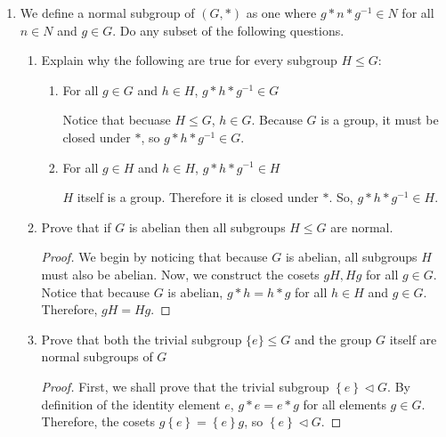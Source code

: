 \documentclass{article}
\newcommand{\set}[1]{\left\{#1\right\}}
\newcommand{\inv}{^{-1}}
\newcommand{\normsub}{\lhd}
\begin{document}
\begin{enumerate}
    \item [1.] {
        We define a normal subgroup of \((G,*)\) as one where \(g * n * g^{-1} \in N\) for all \(n \in N\) and \(g \in G\). Do any subset of the following questions.
  
        \begin{enumerate}
            \item {
                Explain why the following are true for every subgroup \(H \leq G\):
      
                \begin{enumerate}
                    \item {
                        For all \(g \in G\) and \(h \in H\), \(g * h * g^{-1} \in G\)

                        Notice that becuase \(H \le G\), \(h \in G\). Because 
                        \(G\) is a group, it must be closed under \(*\), so 
                        \(g * h * g\inv \in G\).
                    }
                    \item {
                        For all \(g \in H\) and \(h \in H\), \(g * h * g^{-1} \in H\)

                        \(H\) itself is a group. Therefore it is closed under \(*\).
                        So, \(g * h * g\inv \in H\).
                    }
                \end{enumerate}
            }

            \item {
                Prove that if \(G\) is abelian then all subgroups \(H \leq G\) are normal.
    
                \begin{proof}
                    We begin by noticing that because \(G\) is abelian, all subgroups 
                    \(H\) must also be abelian. Now, we construct the cosets 
                    \(gH, Hg\) for all \(g \in G\). Notice that because \(G\) is 
                    abelian, \(g * h = h * g\) for all \(h \in H\) and \(g \in G\).
                    Therefore, \(gH = Hg\).
                \end{proof}
            }

            \item {
                Prove that both the trivial subgroup \(\{e\} \leq G\) and the group \(G\) itself are normal subgroups of \(G\)

                \begin{proof}
                    First, we shall prove that the trivial subgroup \(\set{e} \normsub G\).
                    By definition of the identity element \(e\), \(g * e = e * g\) 
                    for all elements \(g \in G\). Therefore, the cosets \(g\set{e} = \set{e}g\),
                    so \(\set e \normsub G\).


\end{proof}}
\end{enumerate}}
\end{enumerate}
\end{document}
